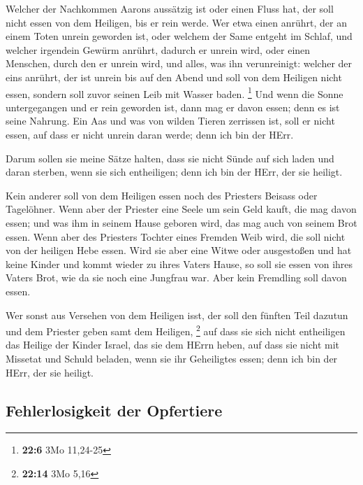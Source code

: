  Welcher der Nachkommen Aarons aussätzig ist oder einen
Fluss hat, der soll nicht essen von dem Heiligen, bis er rein werde. Wer
etwa einen anrührt, der an einem Toten unrein geworden ist, oder welchem
der Same entgeht im Schlaf,  und welcher irgendein Gewürm
anrührt, dadurch er unrein wird, oder einen Menschen, durch den er
unrein wird, und alles, was ihn verunreinigt:  welcher der
eins anrührt, der ist unrein bis auf den Abend und soll von dem Heiligen
nicht essen, sondern soll zuvor seinen Leib mit Wasser baden.
\footnote{\textbf{22:6} 3Mo 11,24-25}  Und wenn die Sonne
untergegangen und er rein geworden ist, dann mag er davon essen; denn es
ist seine Nahrung.  Ein Aas und was von wilden Tieren
zerrissen ist, soll er nicht essen, auf dass er nicht unrein daran
werde; denn ich bin der HErr.

 Darum sollen sie meine Sätze halten, dass sie nicht Sünde
auf sich laden und daran sterben, wenn sie sich entheiligen; denn ich
bin der HErr, der sie heiligt.

 Kein anderer soll von dem Heiligen essen noch des
Priesters Beisass oder Tagelöhner.  Wenn aber der
Priester eine Seele um sein Geld kauft, die mag davon essen; und was ihm
in seinem Hause geboren wird, das mag auch von seinem Brot essen.
 Wenn aber des Priesters Tochter eines Fremden Weib wird,
die soll nicht von der heiligen Hebe essen.  Wird sie
aber eine Witwe oder ausgestoßen und hat keine Kinder und kommt wieder
zu ihres Vaters Hause, so soll sie essen von ihres Vaters Brot, wie da
sie noch eine Jungfrau war. Aber kein Fremdling soll davon essen.

 Wer sonst aus Versehen von dem Heiligen isst, der soll
den fünften Teil dazutun und dem Priester geben samt dem Heiligen,
\footnote{\textbf{22:14} 3Mo 5,16}  auf dass sie sich
nicht entheiligen das Heilige der Kinder Israel, das sie dem HErrn
heben,  auf dass sie nicht mit Missetat und Schuld
beladen, wenn sie ihr Geheiligtes essen; denn ich bin der HErr, der sie
heiligt.

\hypertarget{fehlerlosigkeit-der-opfertiere}{%
\subsection{Fehlerlosigkeit der
Opfertiere}\label{fehlerlosigkeit-der-opfertiere}}

